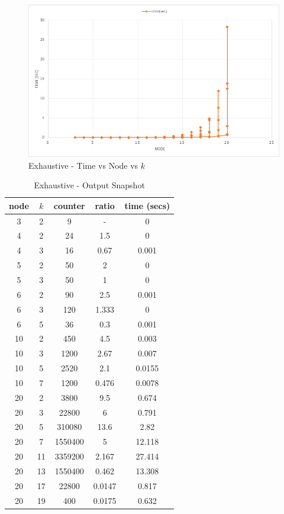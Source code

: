 \documentclass[longpaper, english, final, times]{revdetua}
\begin{document}
			\begin{figure}[!h]
				\includegraphics[width=1\linewidth]{imgs/exhaustiveTimeNodes20.png}
				\caption{Exhaustive - Time vs Node vs $k$}
				\label{figure:exhaustiveTimeNodes20}
			\end{figure}
		
			\begin{table}[!h]
				{\renewcommand{\arraystretch}{1.2}
				\begin{tabular}{|c|c|c|c|c|}
					\hline
					node&$k$&counter&ratio&time (secs)\\
					\hline
					3	&2&	9&	-&	0\\
					\hline
					4	&2	&24	&1.5	&0\\
					4	&3&	16	&0.67	&0.001\\
					\hline
					5&	2	&50	&2	&0\\
					5	&3	&50	&1	&0\\
					\hline
					6	&2	&90	&2.5	&0.001\\
					6	&3	&120	&1.333&	0\\
					6&	5	&36	&0.3	&0.001\\
					\hline
					10&	2&	450	&4.5&	0.003\\
					10&	3&	1200&2.67&	0.007\\
					10&	5&	2520&2.1&	0.0155\\
					10&	7&	1200&0.476&	0.0078\\
					\hline
					20&	2&	3800&	9.5&	0.674\\
					20&	3&	22800&	6	&0.791\\
					20&	5&	310080&	13.6&	2.82\\
					20&	7&	1550400&	5&	12.118\\
					20&	11&	3359200&	2.167&	27.414\\
					20&	13&	1550400	&0.462&	13.308\\
					20&	17&	22800	&0.0147&	0.817\\
					20&	19&	400&	0.0175&	0.632\\
					\hline
				\end{tabular}
				}
				\caption{Exhaustive - Output Snapshot}
				\label{table:exhaustiveOutputSnapshot}
			\end{table}
		
\end{document}
